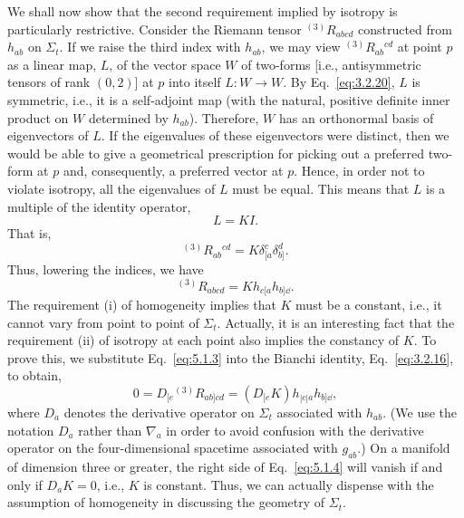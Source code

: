 We shall now show that the second requirement implied by isotropy is particularly
restrictive. Consider the Riemann tensor \({}^{(3)}R_{abcd}\) constructed from
\(h_{ab}\) on \(\Sigma_t\). If we raise the third index with \(h_{ab}\), we may view
\({}^{(3)}R_{ab}{}^{cd}\) at point \(p\) as a linear map, \(L\), of the vector space
\(W\) of two-forms [i.e., antisymmetric tensors of rank \((0,2)\)] at \(p\) into
itself \(L:W\to W\). By Eq.~\eqref{eq:3.2.20}, \(L\) is symmetric, i.e., it is a
self-adjoint map (with the natural, positive definite inner product on \(W\)
determined by \(h_{ab}\)). Therefore, \(W\) has an orthonormal basis of eigenvectors
of \(L\). If the eigenvalues of these eigenvectors were distinct, then we would be
able to give a geometrical prescription for picking out a preferred two-form at \(p\)
and, consequently, a preferred vector at \(p\). Hence, in order not to violate
isotropy, all the eigenvalues of \(L\) must be equal. This means that \(L\) is a
multiple of the identity operator,
\begin{equation}
  L=KI.
  \tag{5.1.1}\label{eq:5.1.1}
\end{equation}
That is,
\begin{equation}
  {}^{(3)}R_{ab}{}^{cd}=K\delta^c_{[a}\delta^d_{b]}.
  \tag{5.1.2}\label{eq:5.1.2}
\end{equation}
Thus, lowering the indices, we have
\begin{equation}
  {}^{(3)}R_{abcd}=K h_{c[a}h_{b]\dd}.
  \tag{5.1.3}\label{eq:5.1.3}
\end{equation}
The requirement (i) of homogeneity implies that \(K\) must be a constant, i.e., it
cannot vary from point to point of \(\Sigma_t\). Actually, it is an interesting fact
that the requirement (ii) of isotropy at each point also implies the constancy of
\(K\). To prove this, we substitute Eq.~\eqref{eq:5.1.3} into the Bianchi identity,
Eq.~\eqref{eq:3.2.16}, to obtain,
\begin{equation}
  0=D_{[e}{}^{(3)}R_{ab]cd}=(D_{[e}K)h_{|c|a}h_{b]\dd},
  \tag{5.1.4}\label{eq:5.1.4}
\end{equation}
where \(D_a\) denotes the derivative operator on \(\Sigma_t\) associated with
\(h_{ab}\). (We use the notation \(D_a\) rather than \(\nabla_a\) in order to avoid
confusion with the derivative operator on the four-dimensional spacetime associated
with \(g_{ab}\).) On a manifold of dimension three or greater, the right side of
Eq.~\eqref{eq:5.1.4} will vanish if and only if \(D_aK=0\), i.e., \(K\) is constant.
Thus, we can actually dispense with the assumption of homogeneity in discussing the
geometry of \(\Sigma_t\).

